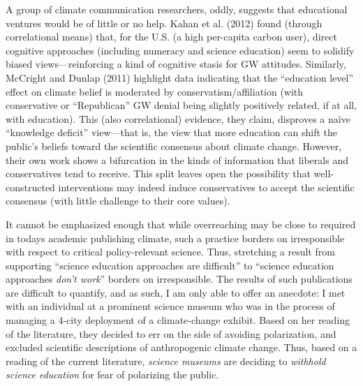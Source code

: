 A group of climate communication researchers, oddly, suggests that educational
ventures would be of little or no help.  Kahan et al. (2012) found (through
correlational means) that, for the U.S. (a high per-capita carbon user), direct
cognitive approaches (including numeracy and science education) seem to solidify
biased views---reinforcing a kind of cognitive stasis for GW attitudes.
Similarly, McCright and Dunlap (2011) highlight data indicating that the
``education level'' effect on climate belief is moderated by
conservatism/affiliation (with conservative or ``Republican'' GW denial being
slightly positively related, if at all, with education). This (also
correlational) evidence, they claim, disproves a naïve ``knowledge deficit''
view---that is, the view that more education can shift the public's beliefs
toward the scientific consensus about climate change. However, their own work
shows a bifurcation in the kinds of information that liberals and conservatives
tend to receive.
This split leaves open the possibility that well-constructed
interventions may indeed induce conservatives to accept the scientific consensus
(with little challenge to their core values).  

It cannot be emphasized enough that while overreaching may be close to required
in todays academic publishing climate, such a practice borders on irresponsible
with respect to critical policy-relevant science. Thus, stretching a result from
supporting “science education approaches are difficult” to “science education
approaches \emph{don't work}” borders on irresponsible. The results of such
publications are difficult to quantify, and as such, I am only able to offer an
anecdote: I met with an individual at a prominent science museum who
was in the process of managing a 4-city deployment of a climate-change exhibit.
Based on her reading of the literature, they decided to err on the side of
avoiding polarization, and excluded scientific descriptions of anthropogenic
climate change. Thus, based on a reading of the current literature,
\emph{science museums} are deciding to \emph{withhold science education} for
fear of polarizing the public.

